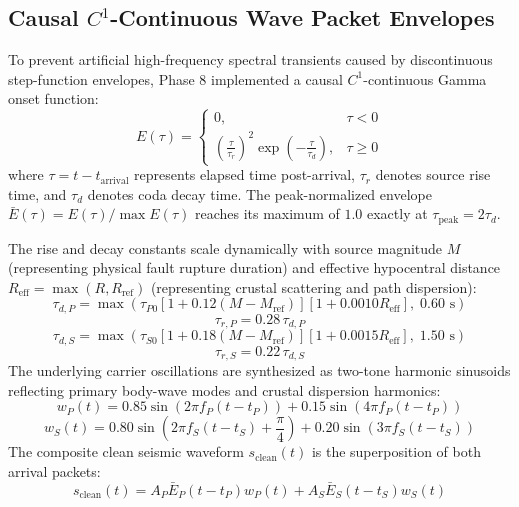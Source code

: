 \documentclass[journal]{IEEEtran}
\begin{document}
\subsection{Causal $C^1$-Continuous Wave Packet Envelopes}
To prevent artificial high-frequency spectral transients caused by discontinuous step-function envelopes, Phase 8 implemented a causal $C^1$-continuous Gamma onset function:
\begin{equation}
E(\tau) = 
\begin{cases}
0, & \tau < 0 \\
\left( \frac{\tau}{\tau_r} \right)^2 \exp\left( - \frac{\tau}{\tau_d} \right), & \tau \ge 0
\end{cases}
\label{eq:gamma_envelope}
\end{equation}
where $\tau = t - t_{\text{arrival}}$ represents elapsed time post-arrival, $\tau_r$ denotes source rise time, and $\tau_d$ denotes coda decay time. The peak-normalized envelope $\bar{E}(\tau) = E(\tau) / \max E(\tau)$ reaches its maximum of $1.0$ exactly at $\tau_{\text{peak}} = 2\tau_d$.

The rise and decay constants scale dynamically with source magnitude $M$ (representing physical fault rupture duration) and effective hypocentral distance $R_{\text{eff}} = \max(R, R_{\text{ref}})$ (representing crustal scattering and path dispersion):
\begin{equation}
\tau_{d,P} = \max\left(\tau_{P0} \left[1 + 0.12 (M - M_{\text{ref}})\right] \left[1 + 0.0010 R_{\text{eff}}\right], \; 0.60\text{ s}\right)
\label{eq:tau_dp}
\end{equation}
\begin{equation}
\tau_{r,P} = 0.28 \, \tau_{d,P}
\end{equation}
\begin{equation}
\tau_{d,S} = \max\left(\tau_{S0} \left[1 + 0.18 (M - M_{\text{ref}})\right] \left[1 + 0.0015 R_{\text{eff}}\right], \; 1.50\text{ s}\right)
\label{eq:tau_ds}
\end{equation}
\begin{equation}
\tau_{r,S} = 0.22 \, \tau_{d,S}
\end{equation}
The underlying carrier oscillations are synthesized as two-tone harmonic sinusoids reflecting primary body-wave modes and crustal dispersion harmonics:
\begin{equation}
w_P(t) = 0.85 \sin(2\pi f_P (t - t_P)) + 0.15 \sin(4\pi f_P (t - t_P))
\end{equation}
\begin{equation}
w_S(t) = 0.80 \sin\left(2\pi f_S (t - t_S) + \frac{\pi}{4}\right) + 0.20 \sin(3\pi f_S (t - t_S))
\end{equation}
The composite clean seismic waveform $s_{\text{clean}}(t)$ is the superposition of both arrival packets:
\begin{equation}
s_{\text{clean}}(t) = A_P \bar{E}_P(t - t_P) w_P(t) + A_S \bar{E}_S(t - t_S) w_S(t)
\label{eq:clean_signal}
\end{equation}
\end{document}
